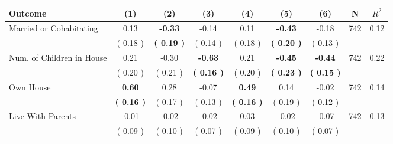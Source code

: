 \begin{tabular}{lcccccccc}
\toprule
 \textbf{Outcome} & \textbf{(1)} & \textbf{(2)} & \textbf{(3)} & \textbf{(4)} & \textbf{(5)} & \textbf{(6)} & \textbf{N} & \textbf{$ R^2$} \\
\midrule
Married or Cohabitating &      0.13 & \textbf{    -0.33} &     -0.14 &      0.11 & \textbf{    -0.43} &     -0.18 & 742 &       0.12 \\ 
 & (     0.18 ) & \textbf{(     0.19 )} & (     0.14 ) & (     0.18 ) & \textbf{(     0.20 )} & (     0.13 ) & \\
Num. of Children in House &      0.21 &     -0.30 & \textbf{    -0.63} &      0.21 & \textbf{    -0.45} & \textbf{    -0.44} & 742 &       0.22 \\ 
 & (     0.20 ) & (     0.21 ) & \textbf{(     0.16 )} & (     0.20 ) & \textbf{(     0.23 )} & \textbf{(     0.15 )} & \\
Own House & \textbf{     0.60} &      0.28 &     -0.07 & \textbf{     0.49} &      0.14 &     -0.02 & 742 &       0.14 \\ 
 & \textbf{(     0.16 )} & (     0.17 ) & (     0.13 ) & \textbf{(     0.16 )} & (     0.19 ) & (     0.12 ) & \\
Live With Parents &     -0.01 &     -0.02 &     -0.02 &      0.03 &     -0.02 &     -0.07 & 742 &       0.13 \\ 
 & (     0.09 ) & (     0.10 ) & (     0.07 ) & (     0.09 ) & (     0.10 ) & (     0.07 ) & \\
\bottomrule
\end{tabular}
